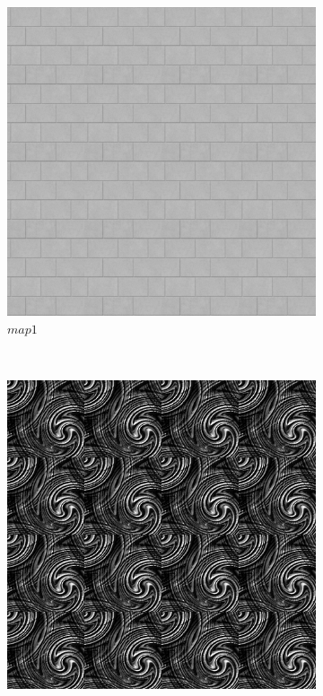 \documentclass{article}
\begin{document}
\begin{enumerate}[label=(\alph*)]
        \begin{figure}[!htb]
            \centering
            \begin{subfigure}[b]{0.3\textwidth}
                \includegraphics[width=\textwidth]{img/map1.png}
                \caption{$map1$}
            \end{subfigure}
            ~
            \begin{subfigure}[b]{0.3\textwidth}
                \includegraphics[width=\textwidth]{img/map2.png}

\end{subfigure}
\end{figure}
\end{enumerate}
\end{document}
